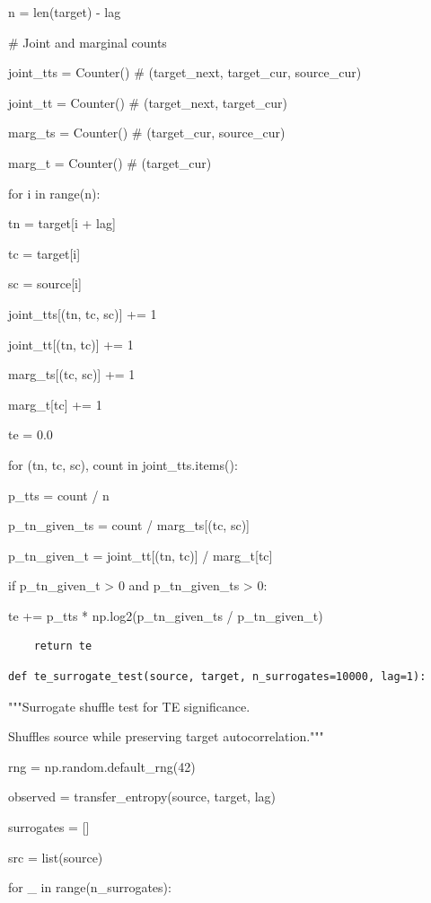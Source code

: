 \documentclass[11pt,letterpaper]{article}
\begin{document}
    n = len(target) - lag


    \# Joint and marginal counts


    joint\_tts = Counter()   \# (target\_next, target\_cur, source\_cur)


    joint\_tt = Counter()    \# (target\_next, target\_cur)


    marg\_ts = Counter()     \# (target\_cur, source\_cur)


    marg\_t = Counter()      \# (target\_cur)


    for i in range(n):


        tn = target[i + lag]


        tc = target[i]


        sc = source[i]


        joint\_tts[(tn, tc, sc)] += 1


        joint\_tt[(tn, tc)] += 1


        marg\_ts[(tc, sc)] += 1


        marg\_t[tc] += 1


    te = 0.0


    for (tn, tc, sc), count in joint\_tts.items():


        p\_tts = count / n


        p\_tn\_given\_ts = count / marg\_ts[(tc, sc)]


        p\_tn\_given\_t = joint\_tt[(tn, tc)] / marg\_t[tc]


        if p\_tn\_given\_t > 0 and p\_tn\_given\_ts > 0:


            te += p\_tts * np.log2(p\_tn\_given\_ts / p\_tn\_given\_t)

\begin{lstlisting}
    return te
\end{lstlisting}
\begin{lstlisting}
def te_surrogate_test(source, target, n_surrogates=10000, lag=1):
\end{lstlisting}

    """Surrogate shuffle test for TE significance.


    Shuffles source while preserving target autocorrelation."""


    rng = np.random.default\_rng(42)


    observed = transfer\_entropy(source, target, lag)


    surrogates = []


    src = list(source)


    for \_ in range(n\_surrogates):
\end{document}
